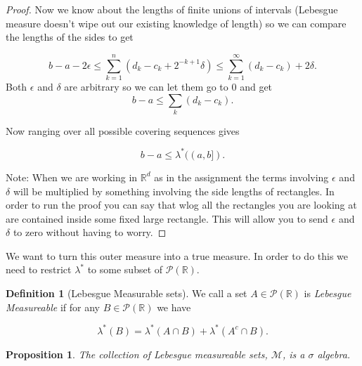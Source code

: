 \documentclass[
]{book}
\newtheorem{proposition}{Proposition}[chapter]
\theoremstyle{definition}
\newtheorem{definition}{Definition}[chapter]
\theoremstyle{definition}
\theoremstyle{definition}
\theoremstyle{definition}
\theoremstyle{remark}
\begin{document}
\begin{proof}
Now we know about the lengths of finite unions of intervals (Lebesgue measure doesn't wipe out our existing knowledge of length) so we can compare the lengths of the sides to get

\[ b-a - 2\epsilon \leq \sum_{k=1}^n (d_k - c_k + 2^{-k+1} \delta) \leq \sum_{k=1}^\infty (d_k-c_k) + 2 \delta. \] Both $\epsilon$ and $\delta$ are arbitrary so we can let them go to $0$ and get
\[ b-a \leq \sum_k (d_k - c_k). \]

Now ranging over all possible covering sequences gives

\[ b-a \leq \lambda^*((a,b]). \]

Note: When we are working in \(\mathbb{R}^d\) as in the assignment the terms involving \(\epsilon\) and \(\delta\) will be multiplied by something involving the side lengths of rectangles. In order to run the proof you can say that wlog all the rectangles you are looking at are contained inside some fixed large rectangle. This will allow you to send \(\epsilon\) and \(\delta\) to zero without having to worry.
\end{proof}

We want to turn this outer measure into a true measure. In order to do this we need to restrict \(\lambda^*\) to some subset of \(\mathscr{P}(\mathbb{R})\).

\begin{definition}[Lebesgue Measurable sets]
We call a set \(A \in \mathscr{P}(\mathbb{R})\) is \emph{Lebesgue Measureable} if for any \(B \in \mathscr{P}(\mathbb{R})\) we have

\[ \lambda^*(B) = \lambda^*(A \cap B) + \lambda^*(A^c \cap B). \]
\end{definition}

\begin{proposition}
The collection of Lebesgue measureable sets, \(\mathscr{M}\), is a \(\sigma\) algebra.
\end{proposition}
\end{document}
